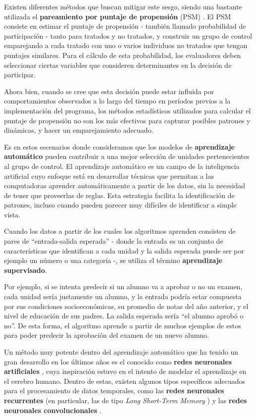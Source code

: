 \documentclass[../main.tex]{subfiles}
\begin{document}
Existen diferentes métodos que buscan mitigar este sesgo, siendo una bastante utilizada el
\textbf{pareamiento por puntaje de propensión} (PSM)
\cite{psm1983}\cite{a-primer-for-applying-psm}. El PSM consiste en estimar el puntaje de
propensión - también llamado probabilidad de participación - tanto para tratados y no
tratados, y construir un grupo de control emparejando a cada tratado con uno o varios
individuos no tratados que tengan puntajes similares. Para el cálculo de esta
probabilidad, los evaluadores deben seleccionar ciertas variables que consideren
determinantes en la decisión de participar.

Ahora bien, cuando se cree que esta decisión puede estar influida por comportamientos
observados a lo largo del tiempo en períodos previos a la implementación del programa, los
métodos estadísticos utilizados para calcular el puntaje de propensión no son los más
efectivos para capturar posibles patrones y dinámicas, y hacer un emparejamiento adecuado.

Es en estos escenarios donde consideramos que los modelos de \textbf{aprendizaje
automático} \cite{deep-learning}\cite{ai-a-modern-approach} pueden contribuir a una mejor
selección de unidades pertenecientes al grupo de control. El aprendizaje automático es un
campo de la inteligencia artificial cuyo enfoque está en desarrollar técnicas que permitan
a las computadoras aprender automáticamente a partir de los datos, sin la necesidad de
tener que proveerlas de reglas. Esta estrategia facilita la identificación de patrones,
incluso cuando pueden parecer muy difíciles de identificar a simple vista.

Cuando los datos a partir de los cuales los algoritmos aprenden consisten de pares de
``entrada-salida esperada'' - donde la entrada es un conjunto de características que
identifican a cada unidad y la salida esperada puede ser por ejemplo un número o una
categoría -, se utiliza el término \textbf{aprendizaje supervisado}.

Por ejemplo, si se intenta predecir si un alumno va a aprobar o no un examen, cada unidad
sería justamente un alumno, y la entrada podría estar compuesta por sus condiciones
socioeconómicas, su promedio de notas del año anterior, y el nivel de educación de sus
padres. La salida esperada sería ``el alumno aprobó o no''. De esta forma, el algoritmo
aprende a partir de muchos ejemplos de estos para poder predecir la aprobación del examen
de un nuevo alumno.

Un método muy potente dentro del aprendizaje automático que ha tenido un gran desarrollo
en los últimos años es el conocido como \textbf{redes neuronales artificiales}
\cite{nielsen}, cuya inspiración estuvo en el intento de modelar el aprendizaje en el
cerebro humano. Dentro de estas, existen algunos tipos específicos adecuados para el
procesamiento de datos temporales, como las \textbf{redes neuronales recurrentes} (en
particular, las de tipo \textit{Long Short-Term Memory}\cite{lstm-paper-1997} ) y las
\textbf{redes neuronales convolucionales} \cite{prince2024understanding}.
\end{document}
